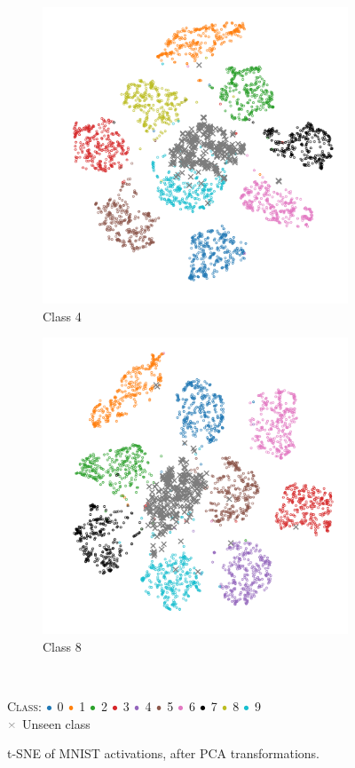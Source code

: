 \documentclass[10pt]{article}
\newcommand{\legendBulletMNIST}{
    \begin{minipage}[t]{0.5\textwidth}
    \centering
    \textsc{Class}:
    ${\color[rgb]{0.12, 0.47, 0.71}\bullet}$ 0
    ${\color[rgb]{1.0, 0.5, 0.05}\bullet}$ 1
    ${\color[rgb]{0.17, 0.63, 0.17}\bullet}$ 2
    ${\color[rgb]{0.84, 0.15, 0.16}\bullet}$ 3
    ${\color[rgb]{0.58, 0.4, 0.74}\bullet}$ 4
    ${\color[rgb]{0.55, 0.34, 0.29}\bullet}$ 5
    ${\color[rgb]{0.89, 0.47, 0.76}\bullet}$ 6
    ${\color[rgb]{0, 0, 0}\bullet}$ 7
    ${\color[rgb]{0.74, 0.74, 0.13}\bullet}$ 8
    ${\color[rgb]{0.09, 0.75, 0.81}\bullet}$ 9\\
    ${\color[rgb]{0.5, 0.5, 0.5}\times}$ Unseen class
    \end{minipage}
    }
\begin{document}
\begin{figure}[H]
    \centering
    \begin{subfigure}{.49\textwidth}
        \centering
        \includegraphics[width=\textwidth]{MNIST_t-SNE_wo_cl_4_after}
        \caption{Class 4}
    \end{subfigure}
    \begin{subfigure}{.5\textwidth}
        \centering
        \includegraphics[width=\textwidth]{MNIST_t-SNE_wo_cl_8_after}
        \caption{Class 8}
    \end{subfigure}
    \\[.2cm]
    \legendBulletMNIST
    \caption{t-SNE of \gls{MNIST} activations, after \gls{PCA} transformations.}
    \label{fig:tsne-mnist-miscl}
\end{figure}
\end{document}
